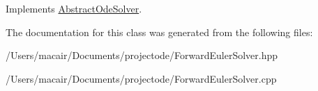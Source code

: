 Implements \hyperlink{class_abstract_ode_solver_ad7d73b20e9ce5c8f3aab1a15bebe3e4c}{Abstract\+Ode\+Solver}.



The documentation for this class was generated from the following files\+:\begin{DoxyCompactItemize}
\item 
/\+Users/macair/\+Documents/projectode/Forward\+Euler\+Solver.\+hpp\item 
/\+Users/macair/\+Documents/projectode/Forward\+Euler\+Solver.\+cpp\end{DoxyCompactItemize}
